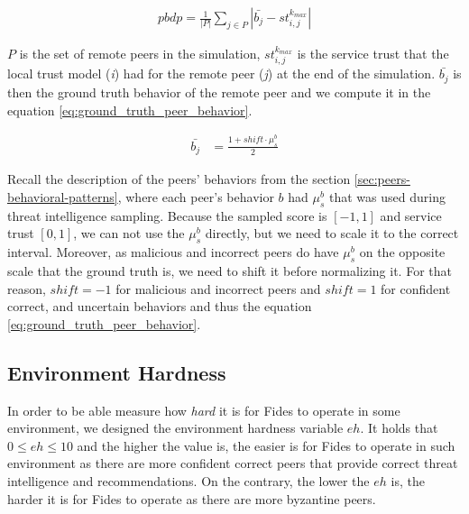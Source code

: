 \begin{equation}
\begin{split}
    pbdp = \frac{1}{|P|} \sum_{j \in P}\left|\bar{b_{j}} - st^{k_{max}}_{i, j} \right|
\end{split}
\label{eq:peers_behavior_detection_metric}
\end{equation}

$P$ is the set of remote peers in the simulation, $st^{k_{max}}_{i, j}$ is the service trust that the local trust model (\textit{i}) had for the remote peer (\textit{j}) at the end of the simulation.
$\bar{b_{j}}$ is then the ground truth behavior of the remote peer and we compute it in the equation \ref{eq:ground_truth_peer_behavior}.

\begin{equation}
    \begin{split}
    \bar{b_{j}} &= \frac{1 + shift \cdot \mu^{b}_{s}}{2}
    \end{split}
    \label{eq:ground_truth_peer_behavior}
\end{equation}

Recall the description of the peers' behaviors from the section \ref{sec:peers-behavioral-patterns}, where each peer's behavior $b$ had $\mu^{b}_{s}$ that was used during threat intelligence sampling.
Because the sampled score is $[-1, 1]$ and service trust $[0, 1]$, we can not use the $\mu^{b}_{s}$ directly, but we need to scale it to the correct interval.
Moreover, as malicious and incorrect peers  do have $\mu^{b}_{s}$ on the opposite scale that the ground truth is, we need to shift it before normalizing it.
For that reason, $shift = -1$ for malicious and incorrect peers and $shift = 1$ for confident correct, and uncertain behaviors and thus the equation \ref{eq:ground_truth_peer_behavior}.

\subsection{Environment Hardness}
\label{subsec:environment-hardness}
In order to be able measure how \textit{hard} it is for Fides to operate in some environment, we designed the environment hardness variable $eh$.
It holds that $0 \leq eh \leq 10$ and the higher the value is, the easier is for Fides to operate in such environment as there are more confident correct peers that provide correct threat intelligence and recommendations.
On the contrary, the lower the $eh$ is, the harder it is for Fides to operate as there are more byzantine peers.


